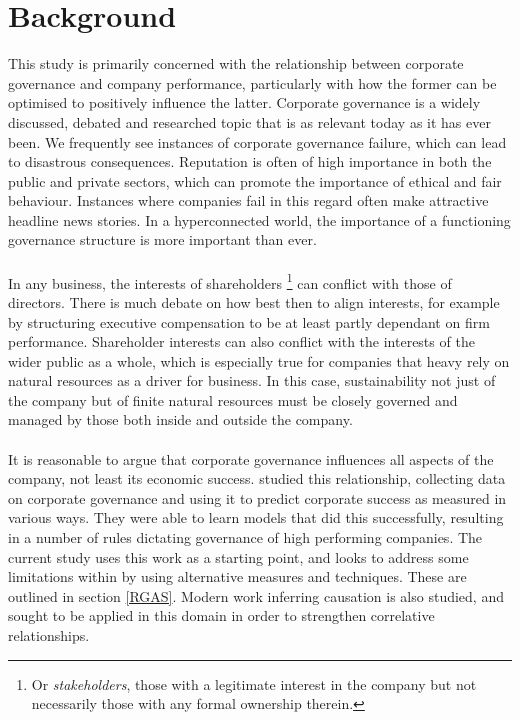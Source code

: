 \section{Background}
{This study is primarily concerned with the relationship between corporate governance and company performance, particularly with how the former can be optimised to positively influence the latter. Corporate governance is a widely discussed, debated and researched topic that is as relevant today as it has ever been. We frequently see instances of corporate governance failure, which can lead to disastrous consequences. Reputation is often of high importance in both the public and private sectors, which can promote the importance of ethical and fair behaviour. Instances where companies fail in this regard often make attractive headline news stories. In a hyperconnected world, the importance of a functioning governance structure is more important than ever. \\\\
In any business, the interests of shareholders \footnote{Or {\it stakeholders}, those with a legitimate interest in the company but not necessarily those with any formal ownership therein.} can conflict with those of directors. There is much debate on how best then to align interests, for example by structuring executive compensation to be at least partly dependant on firm performance. Shareholder interests can also conflict with the interests of the wider public as a whole, which is especially true for companies that heavy rely on natural resources as a driver for business. In this case, sustainability not just of the company but of finite natural resources must be closely governed and managed by those both inside and outside the company.     \\\\
It is reasonable to argue that corporate governance influences all aspects of the company, not least its economic success. \cite{moldovan2015learning} studied this relationship, collecting data on corporate governance and using it to predict corporate success as measured in various ways. They were able to learn models that did this successfully, resulting in a number of rules dictating governance of high performing companies. The current study uses this work as a starting point, and looks to address some limitations within by using alternative measures and techniques. These are outlined in section \ref{RGAS}. Modern work inferring causation is also studied, and sought to be applied in this domain in order to strengthen correlative relationships.   }

